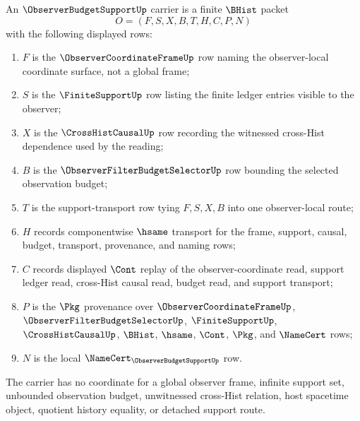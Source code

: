 \begin{definition}
\label{def:observer-budget-support-carrier}
An $\ObserverBudgetSupportUp$ carrier is a finite $\BHist$ packet
$$
O=(F,S,X,B,T,H,C,P,N)
$$
with the following displayed rows:
\begin{enumerate}
\item $F$ is the $\ObserverCoordinateFrameUp$ row naming the observer-local coordinate surface, not a global frame;
\item $S$ is the $\FiniteSupportUp$ row listing the finite ledger entries visible to the observer;
\item $X$ is the $\CrossHistCausalUp$ row recording the witnessed cross-Hist dependence used by the reading;
\item $B$ is the $\ObserverFilterBudgetSelectorUp$ row bounding the selected observation budget;
\item $T$ is the support-transport row tying $F,S,X,B$ into one observer-local route;
\item $H$ records componentwise $\hsame$ transport for the frame, support, causal, budget, transport, provenance, and naming rows;
\item $C$ records displayed $\Cont$ replay of the observer-coordinate read, support ledger read, cross-Hist causal read, budget read, and support transport;
\item $P$ is the $\Pkg$ provenance over $\ObserverCoordinateFrameUp$, $\ObserverFilterBudgetSelectorUp$, $\FiniteSupportUp$, $\CrossHistCausalUp$, $\BHist$, $\hsame$, $\Cont$, $\Pkg$, and $\NameCert$ rows;
\item $N$ is the local $\NameCert_{\ObserverBudgetSupportUp}$ row.
\end{enumerate}
The carrier has no coordinate for a global observer frame, infinite support set, unbounded observation budget, unwitnessed cross-Hist relation, host spacetime object, quotient history equality, or detached support route.
\end{definition}

